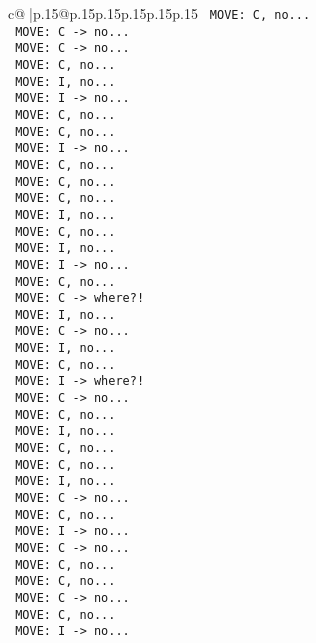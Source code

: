 \documentclass{article}
\begin{document}
{\begin{supertabular}{c@{$\;$}|p{.15\linewidth}@{}p{.15\linewidth}p{.15\linewidth}p{.15\linewidth}p{.15\linewidth}p{.15\linewidth}}
{{{\texttt{ MOVE: C, no...} \\
\texttt{ MOVE: C {-}> no...} \\
\texttt{ MOVE: C {-}> no...} \\
\texttt{ MOVE: C, no...} \\
\texttt{ MOVE: I, no...} \\
\texttt{ MOVE: I {-}> no...} \\
\texttt{ MOVE: C, no...} \\
\texttt{ MOVE: C, no...} \\
\texttt{ MOVE: I {-}> no...} \\
\texttt{ MOVE: C, no...} \\
\texttt{ MOVE: C, no...} \\
\texttt{ MOVE: C, no...} \\
\texttt{ MOVE: I, no...} \\
\texttt{ MOVE: C, no...} \\
\texttt{ MOVE: I, no...} \\
\texttt{ MOVE: I {-}> no...} \\
\texttt{ MOVE: C, no...} \\
\texttt{ MOVE: C {-}> where?!} \\
\texttt{ MOVE: I, no...} \\
\texttt{ MOVE: C {-}> no...} \\
\texttt{ MOVE: I, no...} \\
\texttt{ MOVE: C, no...} \\
\texttt{ MOVE: I {-}> where?!} \\
\texttt{ MOVE: C {-}> no...} \\
\texttt{ MOVE: C, no...} \\
\texttt{ MOVE: I, no...} \\
\texttt{ MOVE: C, no...} \\
\texttt{ MOVE: C, no...} \\
\texttt{ MOVE: I, no...} \\
\texttt{ MOVE: C {-}> no...} \\
\texttt{ MOVE: C, no...} \\
\texttt{ MOVE: I {-}> no...} \\
\texttt{ MOVE: C {-}> no...} \\
\texttt{ MOVE: C, no...} \\
\texttt{ MOVE: C, no...} \\
\texttt{ MOVE: C {-}> no...} \\
\texttt{ MOVE: C, no...} \\
\texttt{ MOVE: I {-}> no...} \\
}}}
\end{supertabular}}
\end{document}
